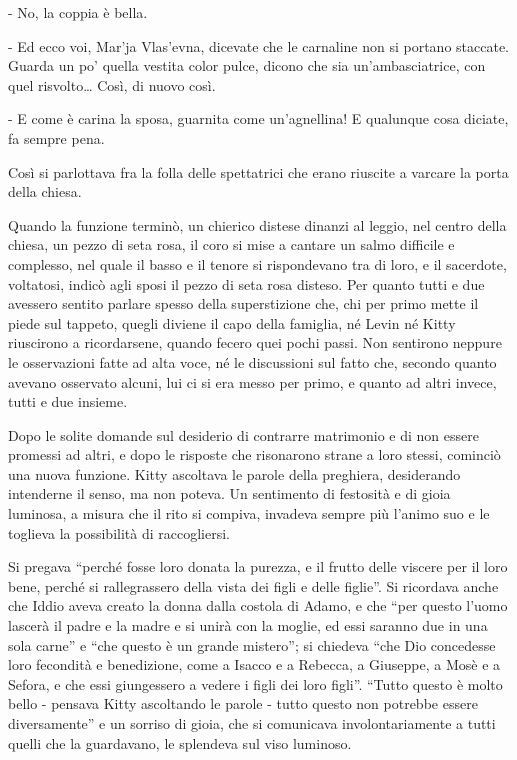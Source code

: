 - No, la coppia è bella. 

- Ed ecco voi, Mar'ja Vlas'evna, dicevate che le carnaline non si portano staccate. Guarda un po' quella vestita color pulce, dicono che sia un'ambasciatrice, con quel risvolto\ldots{} Così, di nuovo così. 

- E come è carina la sposa, guarnita come un'agnellina! E qualunque cosa diciate, fa sempre pena. 

Così si parlottava fra la folla delle spettatrici che erano riuscite a varcare la porta della chiesa. 

\label{vi-4} 

Quando la funzione terminò, un chierico distese dinanzi al leggio, nel centro della chiesa, un pezzo di seta rosa, il coro si mise a cantare un salmo difficile e complesso, nel quale il basso e il tenore si rispondevano tra di loro, e il sacerdote, voltatosi, indicò agli sposi il pezzo di seta rosa disteso. Per quanto tutti e due avessero sentito parlare spesso della superstizione che, chi per primo mette il piede sul tappeto, quegli diviene il capo della famiglia, né Levin né Kitty riuscirono a ricordarsene, quando fecero quei pochi passi. Non sentirono neppure le osservazioni fatte ad alta voce, né le discussioni sul fatto che, secondo quanto avevano osservato alcuni, lui ci si era messo per primo, e quanto ad altri invece, tutti e due insieme. 

Dopo le solite domande sul desiderio di contrarre matrimonio e di non essere promessi ad altri, e dopo le risposte che risonarono strane a loro stessi, cominciò una nuova funzione. Kitty ascoltava le parole della preghiera, desiderando intenderne il senso, ma non poteva. Un sentimento di festosità e di gioia luminosa, a misura che il rito si compiva, invadeva sempre più l'animo suo e le toglieva la possibilità di raccogliersi. 

Si pregava ``perché fosse loro donata la purezza, e il frutto delle viscere per il loro bene, perché si rallegrassero della vista dei figli e delle figlie''. Si ricordava anche che Iddio aveva creato la donna dalla costola di Adamo, e che ``per questo l'uomo lascerà il padre e la madre e si unirà con la moglie, ed essi saranno due in una sola carne'' e ``che questo è un grande mistero''; si chiedeva ``che Dio concedesse loro fecondità e benedizione, come a Isacco e a Rebecca, a Giuseppe, a Mosè e a Sefora, e che essi giungessero a vedere i figli dei loro figli''. ``Tutto questo è molto bello - pensava Kitty ascoltando le parole - tutto questo non potrebbe essere diversamente'' e un sorriso di gioia, che si comunicava involontariamente a tutti quelli che la guardavano, le splendeva sul viso luminoso. 

